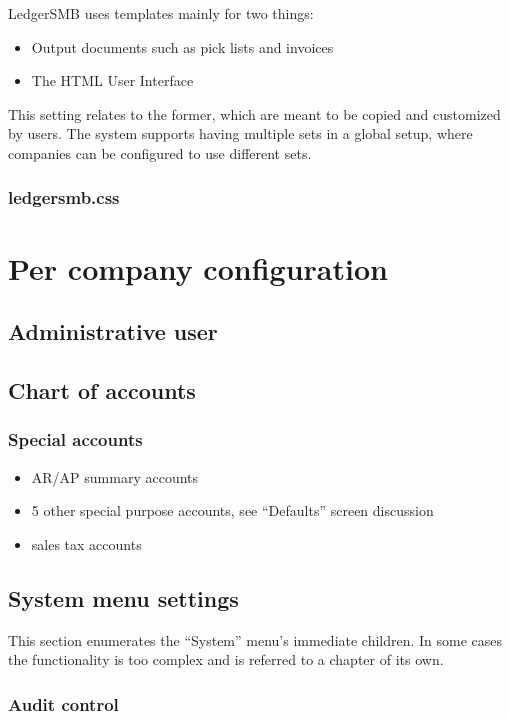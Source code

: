 LedgerSMB uses templates mainly for two things:

\begin{itemize}
\item Output documents such as pick lists and invoices
\item The HTML User Interface
\end{itemize}

This setting relates to the former, which are meant to be copied and customized by users. The system
supports having multiple sets in a global setup, where companies can be configured to use different
sets.




\subsection{ledgersmb.css}

\chapter{Per company configuration}

\section{Administrative user}
\section{Chart of accounts}
\subsection{Special accounts}
\begin{itemize}
\item AR/AP summary accounts
\item 5 other special purpose accounts, see ``Defaults'' screen discussion
\item sales tax accounts
\end{itemize}


\section{System menu settings}

This section enumerates the ``System'' menu's immediate children. In some cases the
functionality is too complex and is referred to a chapter of its own.

\subsection{Audit control}

